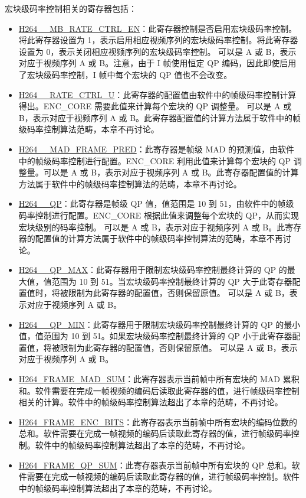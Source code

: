 \documentclass[main\_\_CN.tex]{subfiles}
\begin{document}
宏块级码率控制相关的寄存器包括：
\begin{itemize}
    \item \hyperref[fielddesc:H264AMBRATECTRLEN]{H264\_\_MB\_RATE\_CTRL\_EN}：此寄存器控制是否启用宏块级码率控制。将此寄存器设置为 1，表示启用相应视频序列的宏块级码率控制。将此寄存器设置为 0，表示关闭相应视频序列的宏块级码率控制。 可以是 A 或 B，表示对应于视频序列 A 或 B。注意，由于 I 帧使用恒定 QP 编码，因此即使启用了宏块级码率控制，I 帧中每个宏块的 QP 值也不会改变。
    \item \hyperref[fielddesc:H264ARATECTRLU]{H264\_\_RATE\_CTRL\_U}：此寄存器的配置值由软件中的帧级码率控制计算得出。ENC\_CORE 需要此值来计算每个宏块的 QP 调整量。 可以是 A 或 B，表示对应于视频序列 A 或 B。此寄存器配置值的计算方法属于软件中的帧级码率控制算法范畴，本章不再讨论。
    \item \hyperref[fielddesc:H264AMADFRAMEPRED]{H264\_\_MAD\_FRAME\_PRED}：此寄存器是帧级 MAD 的预测值，由软件中的帧级码率控制进行配置。ENC\_CORE 利用此值来计算每个宏块的 QP 调整量。可以是 A 或 B，表示对应于视频序列 A 或 B。此寄存器配置值的计算方法属于软件中的帧级码率控制算法的范畴，本章不再讨论。
    \item \hyperref[fielddesc:H264AQP]{H264\_\_QP}：此寄存器是帧级 QP 值，值范围是 10 到 51，由软件中的帧级码率控制进行配置。ENC\_CORE 根据此值来调整每个宏块的 QP，从而实现宏块级别的码率控制。 可以是 A 或 B，表示对应于视频序列 A 或 B。此寄存器的配置值的计算方法属于软件中的帧级码率控制算法的范畴，本章不再讨论。
    \item \hyperref[fielddesc:H264AQPMAX]{H264\_\_QP\_MAX}：此寄存器用于限制宏块级码率控制最终计算的 QP 的最大值，值范围为 10 到 51。当宏块级码率控制最终计算的 QP 大于此寄存器配置值时，将被限制为此寄存器的配置值，否则保留原值。 可以是 A 或 B，表示对应于视频序列 A 或 B。
    \item \hyperref[fielddesc:H264AQPMIN]{H264\_\_QP\_MIN}：此寄存器用于限制宏块级码率控制最终计算的 QP 的最小值，值范围为 10 到 51。如果宏块级码率控制最终计算的 QP 小于此寄存器配置值，将被限制为此寄存器的配置值，否则保留原值。 可以是 A 或 B，表示对应于视频序列 A 或 B。
    \item \hyperref[fielddesc:H264FRAMEMADSUM]{H264\_FRAME\_MAD\_SUM}：此寄存器表示当前帧中所有宏块的 MAD 累积和。软件需要在完成一帧视频的编码后读取此寄存器的值，进行帧级码率控制相关的计算。软件中的帧级码率控制算法超出了本章的范畴，不再讨论。
    \item \hyperref[fielddesc:H264FRAMEENCBITS]{H264\_FRAME\_ENC\_BITS}：此寄存器表示当前帧中所有宏块的编码位数的总和。软件需要在完成一帧视频的编码后读取此寄存器的值，进行帧级码率控制。软件中的帧级码率控制算法超出了本章的范畴，不再讨论。
    \item \hyperref[fielddesc:H264FRAMEQPSUM]{H264\_FRAME\_QP\_SUM}：此寄存器表示当前帧中所有宏块的 QP 总和。软件需要在完成一帧视频的编码后读取此寄存器的值，进行帧级码率控制。软件中的帧级码率控制算法超出了本章的范畴，不再讨论。
\end{itemize}
\end{document}
